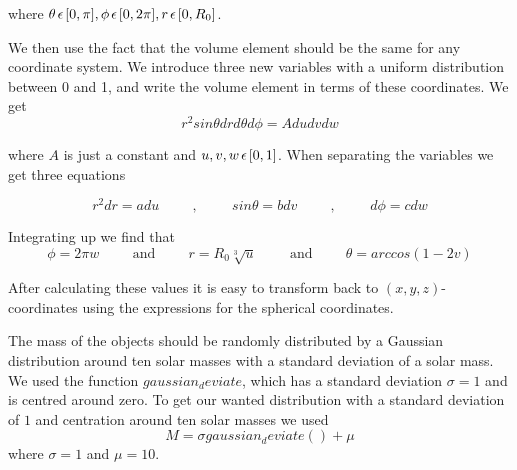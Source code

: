 \documentclass[a4paper,12pt, english]{article}
\begin{document}
where $ \theta \hspace{0.5mm} \epsilon \hspace{0.5mm} [0, \pi], \phi \hspace{0.5mm} \epsilon \hspace{0.5mm} [0, 2\pi], r \hspace{0.5mm} \epsilon \hspace{0.5mm} [0, R_0]$.
 
We then use the fact that the volume element should be the same for any coordinate system. We introduce three new variables with a uniform distribution between 0 and 1, and write the volume element in terms of these coordinates. We get
\[
r^2 sin \theta dr d \theta d \phi = Adudvdw
\]

where $A$ is just a constant and $u, v, w \hspace{0.5mm} \epsilon \hspace{0.5mm} [0,1]$. When separating the variables we get three equations

\[
r^2dr = adu \hspace{1cm}\mathrm{,}\hspace{1cm}
sin \theta = bdv \hspace{1cm}\mathrm{,}\hspace{1cm}
d \phi = cdw
\]

Integrating up we find that
\[
\phi = 2 \pi w \hspace{1cm}\mathrm{and}\hspace{1cm}
r = R_0 \sqrt[3]{u} \hspace{1cm}\mathrm{and}\hspace{1cm}
\theta = arccos(1-2v)
\]

After calculating these values it is easy to transform back to $(x,y,z)$-coordinates using the expressions for the spherical coordinates.


The mass of the objects should be randomly distributed by a Gaussian distribution around ten solar masses with a standard deviation of a solar mass. We used the function $gaussian_deviate$, which has a standard deviation $ \sigma = 1$ and is centred around zero. To get our wanted distribution with a standard deviation of $1$ and centration around ten solar masses we used
$$ M = \sigma gaussian_deviate() + \mu $$
where $\sigma = 1$ and $\mu = 10$.
\end{document}
